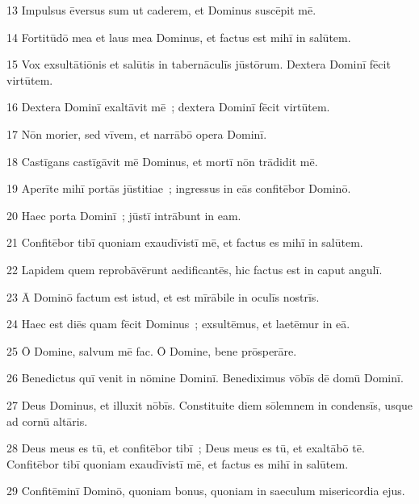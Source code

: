 \psalmVerse
  {\phantom{0}13}
  {Impulsus ēversus sum ut caderem, et Dominus suscēpit mē.}


\psalmVerse
  {\phantom{0}14}
  {Fortitūdō mea et laus mea Dominus, et factus est mihī in salūtem.}


\psalmVerse
  {\phantom{0}15}
  {Vox exsultātiōnis et salūtis in tabernāculīs jūstōrum. Dextera Dominī fēcit virtūtem.}


\psalmVerse
  {\phantom{0}16}
  {Dextera Dominī exaltāvit mē~; dextera Dominī fēcit virtūtem.}


\psalmVerse
  {\phantom{0}17}
  {Nōn morier, sed vīvem, et narrābō opera Dominī.}


\psalmVerse
  {\phantom{0}18}
  {Castīgans castīgāvit mē Dominus, et mortī nōn trādidit mē.}


\psalmVerse
  {\phantom{0}19}
  {Aperīte mihī portās jūstitiae~; ingressus in eās confitēbor Dominō.}


\psalmVerse
  {\phantom{0}20}
  {Haec porta Dominī~; jūstī intrābunt in eam.}


\psalmVerse
  {\phantom{0}21}
  {Confitēbor tibī quoniam exaudīvistī mē, et factus es mihī in salūtem.}


\psalmVerse
  {\phantom{0}22}
  {Lapidem quem reprobāvērunt aedificantēs, hic factus est in caput angulī.}


\psalmVerse
  {\phantom{0}23}
  {Ā Dominō factum est istud, et est mīrābile in oculīs nostrīs.}


\psalmVerse
  {\phantom{0}24}
  {Haec est diēs quam fēcit Dominus~; exsultēmus, et laetēmur in eā.}


\psalmVerse
  {\phantom{0}25}
  {Ō Domine, salvum mē fac. Ō Domine, bene prōsperāre.}


\psalmVerse
  {\phantom{0}26}
  {Benedictus quī venit in nōmine Dominī. Benediximus vōbīs dē domū Dominī.}


\psalmVerse
  {\phantom{0}27}
  {Deus Dominus, et illuxit nōbīs. Constituite diem sōlemnem in condensīs, usque ad cornū altāris.}


\psalmVerse
  {\phantom{0}28}
  {Deus meus es tū, et confitēbor tibī~; Deus meus es tū, et exaltābō tē. Confitēbor tibī quoniam exaudīvistī mē, et factus es mihī in salūtem.}


\psalmVerse
  {\phantom{0}29}
  {Confitēminī Dominō, quoniam bonus, quoniam in saeculum misericordia ejus.}




